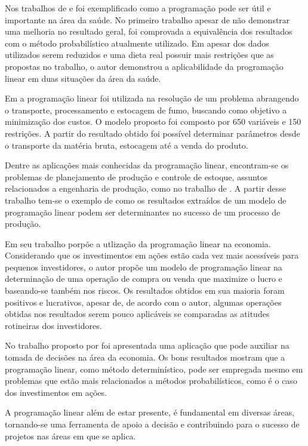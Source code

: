 Nos trabalhos de  e  foi exemplificado como a programação pode ser útil e importante na área da saúde. No primeiro trabalho apesar de não demonstrar uma melhoria no resultado geral, foi comprovada a equivalência dos resultados com o método probabilístico atualmente utilizado. Em  apesar dos dados utilizados serem reduzidos e uma dieta real possuir mais restrições que as propostas no trabalho, o autor demonstrou a aplicabilidade da programação linear em duas situações da área da saúde.

Em  a programação linear foi utilizada na resolução de um problema abrangendo o transporte, processamento e estocagem de fumo, buscando como objetivo a minimização dos custos. O modelo proposto foi composto por 650 variáveis e 150 restrições. A partir do resultado obtido foi possível determinar parâmetros desde o transporte da matéria bruta, estocagem até a venda do produto.

Dentre as aplicações mais conhecidas da programação linear, encontram-se os problemas de planejamento de produção e controle de estoque, assuntos relacionados a engenharia de produção, como no trabalho de . A partir desse trabalho tem-se o exemplo de como os resultados extraídos de um modelo de programação linear podem ser determinantes no sucesso de um processo de produção.

Em seu trabalho  porpõe a utlização da programação linear na economia. Considerando que os investimentos em ações estão cada vez mais acessíveis para pequenos investidores, o autor propõe um modelo de programação linear na determinação de uma operação de compra ou venda que maximize o lucro e baseando-se também nos riscos. Os resultados obtidos em sua maioria foram positivos e lucrativos, apesar de, de acordo com o autor, algumas operações obtidas nos resultados serem pouco aplicáveis se comparadas as atitudes rotineiras dos investidores.

No trabalho proposto por \cite{Krukoski2010Economia} foi apresentada uma aplicação que pode auxiliar na tomada de decisões na área da economia. Os bons resultados mostram que a programação linear, como método determinístico, pode ser empregada mesmo em problemas que estão mais relacionados a métodos probabilísticos, como é o caso dos investimentos em ações.

A programação linear além de estar presente, é fundamental em diversas áreas, tornando-se uma ferramenta de apoio a decisão e contribuindo para o sucesso de projetos nas áreas em que se aplica.

